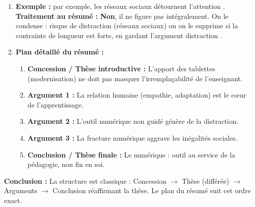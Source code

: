 \documentclass[11pt]{article}
\begin{document}
\begin{exoresolu}
\begin{enumerate}
\begin{enumerate}
        \item Le risque de distraction sans encadrement (réseaux sociaux).
        \item La fracture numérique (exclusion des élèves défavorisés).
    \end{enumerate}
    \item \textbf{Exemple :} \og par exemple, les réseaux sociaux détournent l'attention \fg{}. \textbf{Traitement au résumé :} \textbf{Non}, il ne figure pas intégralement. On le condense : \og risque de distraction (réseaux sociaux) \fg{} ou on le supprime si la contrainte de longueur est forte, en gardant l'argument \og distraction \fg{}.
    \item \textbf{Plan détaillé du résumé :}
    \begin{enumerate}
        \item \textbf{Concession / Thèse introductive :} L'apport des tablettes (modernisation) ne doit pas masquer l'irremplaçabilité de l'enseignant.
        \item \textbf{Argument 1 :} La relation humaine (empathie, adaptation) est le cœur de l'apprentissage.
        \item \textbf{Argument 2 :} L'outil numérique non guidé génère de la distraction.
        \item \textbf{Argument 3 :} La fracture numérique aggrave les inégalités sociales.
        \item \textbf{Conclusion / Thèse finale :} Le numérique : outil au service de la pédagogie, non fin en soi.
    \end{enumerate}
\end{enumerate}
\textbf{Conclusion :} La structure est classique : Concession $\rightarrow$ Thèse (différée) $\rightarrow$ Arguments $\rightarrow$ Conclusion réaffirmant la thèse. Le plan du résumé suit cet ordre exact.
\end{exoresolu}
\end{document}
